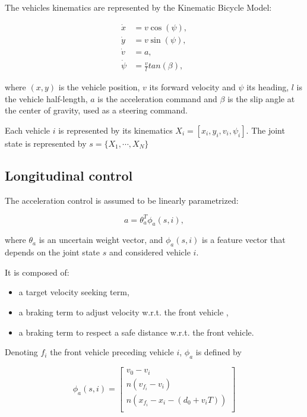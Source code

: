 \documentclass{article}
\begin{document}
The vehicles kinematics are represented by the Kinematic Bicycle Model:

\begin{align}
\dot{x} &= v\cos(\psi), \label{eq:kinematics-x}\\
\dot{y} &= v\sin(\psi), \label{eq:kinematics-y}\\
\dot{v} &= a, \label{eq:kinematics-v} \\
\dot{\psi} &= \frac{v}{l}tan(\beta), \label{eq:kinematics-psi}
\end{align}

where $(x, y)$ is the vehicle position, $v$ its forward velocity and $\psi$ its heading, $l$ is the vehicle half-length, $a$ is the acceleration command and $\beta$ is the slip angle at the center of gravity, used as a steering command.

Each vehicle $i$ is represented by its kinematics $X_i = [x_i, y_i, v_i, \psi_i]$. The joint state is represented by $s = \{X_1, \cdots, X_N\}$

\subsection{Longitudinal control}

The acceleration control is assumed to be linearly parametrized:

\begin{equation}
a = \theta_a^T \phi_a(s, i),
\label{eq:theta_a}
\end{equation}

where $\theta_a$ is an uncertain weight vector, and $\phi_a(s, i)$ is a feature vector that depends on the joint state $s$ and considered vehicle $i$.

It is composed of:
\begin{itemize}
\item a target velocity seeking term,
\item a braking term to adjust velocity w.r.t. the front vehicle ,
\item a braking term to respect a safe distance w.r.t. the front vehicle.
\end{itemize}

Denoting $f_i$ the front vehicle preceding vehicle $i$, $\phi_a$ is defined by

\begin{equation}
\label{eq:phi_a}
\phi_a(s, i) = \begin{bmatrix}
v_0 - v_i \\
n(v_{f_i}-v_i) \\
n(x_{f_i} - x_i - (d_0 + v_iT)) \\
\end{bmatrix}
\end{equation}
\end{document}

